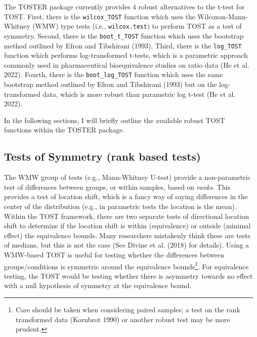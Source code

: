 \documentclass[
]{interact}
\begin{document}
The TOSTER package currently provides 4 robust alternatives to the
t-test for TOST. First, there is the \texttt{wilcox\_TOST} function
which uses the Wilcoxon-Mann-Whitney (WMW) type tests (i.e.,
\texttt{wilcox.test}) to perform TOST as a test of symmetry. Second,
there is the \texttt{boot\_t\_TOST} function which uses the bootstrap
method outlined by Efron and Tibshirani (1993). Third, there is the
\texttt{log\_TOST} function which performs log-transformed t-tests,
which is a parametric approach commonly used in pharmaceutical
bioequivalence studies on ratio data (He et al. 2022). Fourth, there is
the \texttt{boot\_log\_TOST} function which uses the same bootstrap
method outlined by Efron and Tibshirani (1993) but on the
log-transformed data, which is more robust than parametric log t-test
(He et al. 2022).

In the following sections, I will briefly outline the available robust
TOST functions within the TOSTER package.

\hypertarget{tests-of-symmetry-rank-based-tests}{%
\subsection{Tests of Symmetry (rank based
tests)}\label{tests-of-symmetry-rank-based-tests}}

The WMW group of tests (e.g., Mann-Whitney U-test) provide a
non-parametric test of differences between groups, or within samples,
based on \emph{ranks}. This provides a test of location shift, which is
a fancy way of saying differences in the center of the distribution
(e.g., in parametric tests the location is the mean). Within the TOST
framework, there are two separate tests of directional location shift to
determine if the location shift is within (equivalence) or outside
(minimal effect) the equivalence bounds. Many researchers mistakenly
think these are tests of medians, but this is not the case (See Divine
et al. (2018) for details). Using a WMW-based TOST is useful for testing
whether the differences between groups/conditions is symmetric around
the equivalence bounds\footnote{Care should be taken when considering
  paired samples; a test on the rank transformed data (Kornbrot 1990) or
  another robust test may be more prudent.}. For equivalence testing,
the TOST would be testing whether there is asymmetry towards no effect
with a null hypothesis of symmetry at the equivalence bound.
\end{document}
